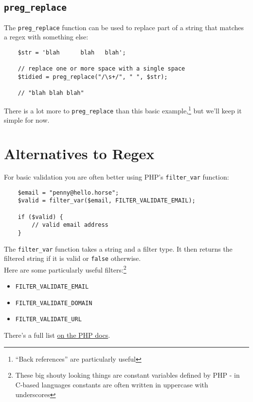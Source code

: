 \subsection{\texttt{preg\_replace}}

The \texttt{preg\_replace} function can be used to replace part of a string that matches a regex with something else:

\begin{verbatim}
    $str = 'blah      blah   blah';

    // replace one or more space with a single space
    $tidied = preg_replace("/\s+/", " ", $str);

    // "blah blah blah"
\end{verbatim}


There is a lot more to \texttt{preg\_replace} than this basic example,\footnote{``Back references'' are particularly useful} but we'll keep it simple for now.


\section{Alternatives to Regex}

For basic validation you are often better using PHP's \texttt{filter\_var} function:

\begin{verbatim}
    $email = "penny@hello.horse";
    $valid = filter_var($email, FILTER_VALIDATE_EMAIL);

    if ($valid) {
        // valid email address
    }
\end{verbatim}

The \texttt{filter\_var} function takes a string and a filter type. It then returns the filtered string if it is valid or \texttt{false} otherwise.
\\

Here are some particularly useful filters:\footnote{These big shouty looking things are constant variables defined by PHP - in C-based languages constants are often written in uppercase with underscores}

\begin{itemize}
    \item \texttt{FILTER\_VALIDATE\_EMAIL}
    \item \texttt{FILTER\_VALIDATE\_DOMAIN}
    \item \texttt{FILTER\_VALIDATE\_URL}
\end{itemize}

There's a full list \href{https://www.php.net/manual/en/filter.filters.validate.php}{on the PHP docs}.



